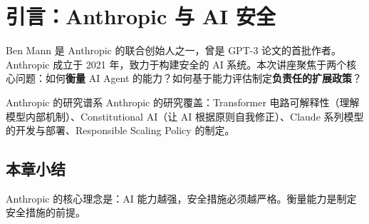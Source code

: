 \section{引言：Anthropic 与 AI 安全}

Ben Mann 是 Anthropic 的联合创始人之一，曾是 GPT-3 论文的首批作者。Anthropic 成立于 2021 年，致力于构建安全的 AI 系统。本次讲座聚焦于两个核心问题：如何\textbf{衡量} AI Agent 的能力？如何基于能力评估制定\textbf{负责任的扩展政策}？

\begin{knowledgebox}{Anthropic 的研究谱系}
Anthropic 的研究覆盖：Transformer 电路可解释性（理解模型内部机制）、Constitutional AI（让 AI 根据原则自我修正）、Claude 系列模型的开发与部署、Responsible Scaling Policy 的制定。
\end{knowledgebox}

\subsection{本章小结}

Anthropic 的核心理念是：AI 能力越强，安全措施必须越严格。衡量能力是制定安全措施的前提。

